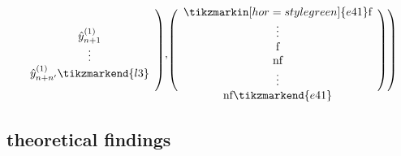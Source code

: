 \documentclass[english,xcolor={rgb,dvipsnames,table,usenames}, presentation]{beamer}
\renewcommand{\textcolor}[1]{}
\newcommand{\f}{\text{f}}
\newcommand{\nf}{\text{nf}}
\begin{document}
\begin{frame}
{\[\begin{array}{c}
 \hat{y}_{n+1}^{(1)} \\
\vdots \\
\hat{y}_{n+n'}^{(1)} \tikzmarkend{l3}\end{array} \textcolor{white}{{\Huge \Bigg)},}
\textcolor{white}{{\Huge \Bigg(}}
\begin{array}{c}
\tikzmarkin[hor=style green]{e41} \text{f} \\
\vdots \\
\text{f} \\ 
\text{nf} \\
\vdots \\
\text{nf} \tikzmarkend{e41} \end{array} \textcolor{white}{{\Huge \Bigg) \Bigg)}}\]
 }
 

\end{frame}



\subsection{theoretical findings}
\end{document}
